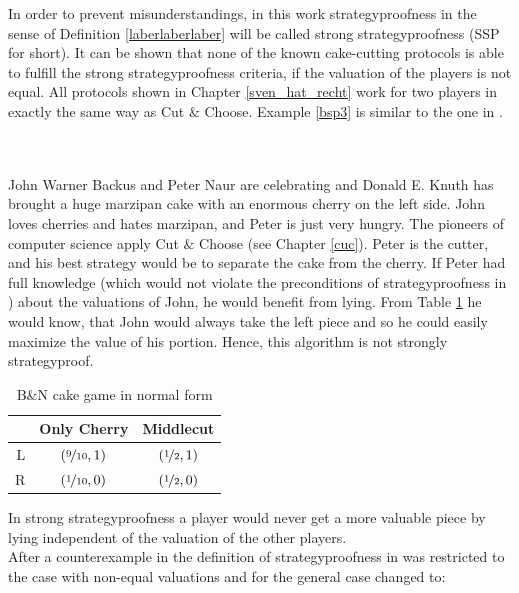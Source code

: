 In order to prevent misunderstandings, in this work strategyproofness in the sense of Definition \ref{laberlaberlaber} will be called strong strategyproofness (SSP for short). It can be shown that none of the known cake-cutting protocols is able to fulfill the strong strategyproofness criteria, if the valuation of the players is not equal. All protocols shown in Chapter \ref{sven_hat_recht} work for two players in exactly the same way as Cut $\&$ Choose. Example \ref{bsp3} is similar to the one in \cite{chen:truth}.

\begin{bsp}
\label{bsp3}
\textcolor{white}{x}\\\\
John Warner Backus and Peter Naur are celebrating and Donald E. Knuth has brought a huge marzipan cake with an enormous cherry on the left side. John loves cherries and hates marzipan, and Peter is just very hungry. The pioneers of computer science apply Cut $\&$ Choose (see Chapter \ref{cuc}). Peter is the cutter, and his best strategy would be to separate the cake from the cherry. If Peter had full knowledge (which would not violate the preconditions of strategyproofness in \cite{why}) about the valuations of John, he would benefit from lying. From Table \ref{Table4} he would know, that John would always take the left piece and so he could easily maximize the value of his portion. Hence, this algorithm is not strongly strategyproof.  
\end{bsp}
\begin{table}[htb]
\centering
 \renewcommand{\arraystretch}{1.2} 
\begin{tabular}{c|c|c|}
\cline{2-3}
&\multicolumn{1}{|c|}{{Only Cherry}}& {Middlecut}\\
\hline
\multicolumn{1}{|r|}{{L}}&$\left(\nicefrac{9}{10}, 1\right)$&$\left(\nicefrac{1}{2}, 1\right)$\\
\hline
\multicolumn{1}{|r|}{{R}}&$\left(\nicefrac{1}{10}, 0\right)$&$\left(\nicefrac{1}{2}, 0\right)$\\
\hline
\end{tabular}
\caption{B$\&$N cake game in normal form}\label{Table4}
\end{table}
In strong strategyproofness a player would never get a more valuable piece by lying independent of the valuation of the other players.\\
\newline
After a counterexample in \cite{ccc} the definition of strategyproofness in \cite{pie} was restricted to the case with non-equal valuations and for the general case changed to:

